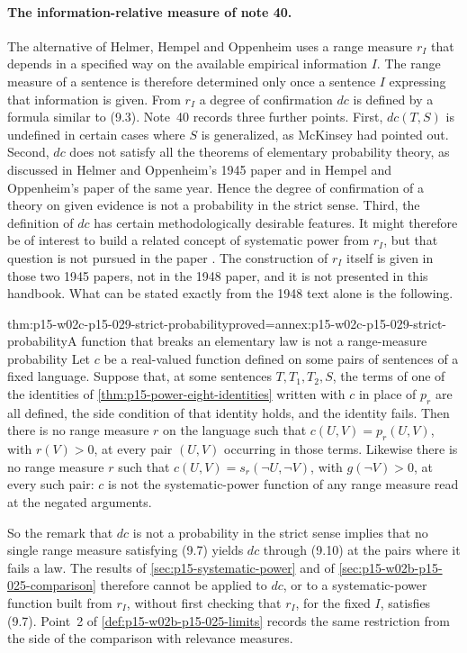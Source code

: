 \paragraph{The information-relative measure of note 40.}
The alternative of Helmer, Hempel and Oppenheim uses a range measure
\(r_I\) that depends in a specified way on the available empirical
information \(I\). The range measure of a sentence is therefore
determined only once a sentence \(I\) expressing that information is
given. From \(r_I\) a degree of confirmation \(dc\) is defined by a
formula similar to (9.3). Note~40 records three further points. First,
\(dc(T,S)\) is undefined in certain cases where \(S\) is generalized, as
McKinsey had pointed out. Second, \(dc\) does not satisfy all the
theorems of elementary probability theory, as discussed in Helmer and
Oppenheim's 1945 paper and in Hempel and Oppenheim's paper of the same
year. Hence the degree of confirmation of a theory on given evidence is
not a probability in the strict sense. Third, the definition of \(dc\)
has certain methodologically desirable features. It might therefore be of
interest to build a related concept of systematic power from \(r_I\), but
that question is not pursued in the paper
\cite[pp.~170--171, n.~40]{HempelOppenheim1948Explanation}. The
construction of \(r_I\) itself is given in those two 1945 papers, not in
the 1948 paper, and it is not presented in this handbook. What can be
stated exactly from the 1948 text alone is the following.

\begin{hblemma}{thm:p15-w02c-p15-029-strict-probability}{proved=annex:p15-w02c-p15-029-strict-probability}{A function that breaks an elementary law is not a range-measure probability}
Let \(c\) be a real-valued function defined on some pairs of sentences of
a fixed language. Suppose that, at some sentences \(T,T_1,T_2,S\), the
terms of one of the identities of \cref{thm:p15-power-eight-identities}
written with \(c\) in place of \(p_r\) are all defined, the side
condition of that identity holds, and the identity fails. Then there is
no range measure \(r\) on the language such that \(c(U,V)=p_r(U,V)\),
with \(r(V)>0\), at every pair \((U,V)\) occurring in those terms.
Likewise there is no range measure \(r\) such that
\(c(U,V)=s_r(\neg U,\neg V)\), with \(g(\neg V)>0\), at every such pair:
\(c\) is not the systematic-power function of any range measure read at
the negated arguments.
\end{hblemma}

So the remark that \(dc\) is not a probability in the strict sense
implies that no single range measure satisfying (9.7) yields \(dc\)
through (9.10) at the pairs where it fails a law. The results of
\cref{sec:p15-systematic-power} and of
\cref{sec:p15-w02b-p15-025-comparison} therefore cannot be applied to
\(dc\), or to a systematic-power function built from \(r_I\), without
first checking that \(r_I\), for the fixed \(I\), satisfies (9.7).
Point~2 of \cref{def:p15-w02b-p15-025-limits} records the same
restriction from the side of the comparison with relevance measures.

